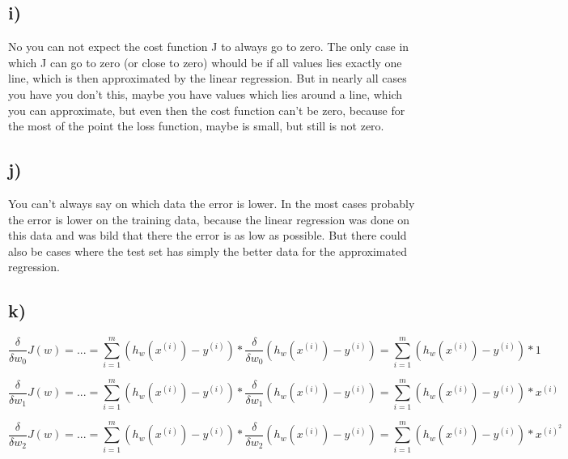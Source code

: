 \documentclass[a4paper]{article}
\begin{document}
\subsection*{i)}
No you can not expect the cost function J to always go to zero. The only case in which J can go to zero (or close to zero) whould be if all values lies exactly one line, which is then approximated by the linear regression. But in nearly all cases you have you don't this, maybe you have values which lies around a line, which you can approximate, but even then the cost function can't be zero, because for the most of the point the loss function, maybe is small, but still is not zero. 

\subsection*{j)}
You can't always say on which data the error is lower. In the most cases probably the error is lower on the training data, because the linear regression was done on this data and was bild that there the error is as low as possible. But there could also be cases where the test set has simply the better data for the approximated regression. 

\subsection*{k)}
\begin{equation}
    \frac{\delta}{\delta w_0} J(w) =...
    = \sum_{i=1}^{m} (h_w(x^{(i)}) - y^{(i)}) * \frac{\delta}{\delta w_0}(h_w(x^{(i)}) - y^{(i)}) 
    = \sum_{i=1}^{m} (h_w(x^{(i)}) - y^{(i)}) * 1
\end{equation}

\begin{equation}
    \frac{\delta}{\delta w_1} J(w) =...
    = \sum_{i=1}^{m} (h_w(x^{(i)}) - y^{(i)}) * \frac{\delta}{\delta w_1}(h_w(x^{(i)}) - y^{(i)}) 
    = \sum_{i=1}^{m} (h_w(x^{(i)}) - y^{(i)}) * x^{(i)}
\end{equation}

\begin{equation}
    \frac{\delta}{\delta w_2} J(w) =...
    = \sum_{i=1}^{m} (h_w(x^{(i)}) - y^{(i)}) * \frac{\delta}{\delta w_2}(h_w(x^{(i)}) - y^{(i)}) 
    = \sum_{i=1}^{m} (h_w(x^{(i)}) - y^{(i)}) * x^{(i)^2}
\end{equation}
\end{document}
